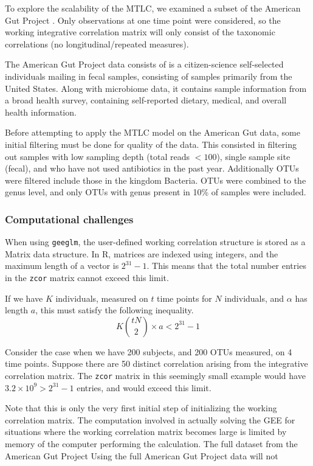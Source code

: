 \documentclass[12pt]{article}
\begin{document}
To explore the scalability of the MTLC, we examined a subset of the American Gut Project \cite{mayer2015gut}. Only observations at one time point were considered, so the working integrative correlation matrix will only consist of the taxonomic correlations (no longitudinal/repeated measures).

The American Gut Project data consists of is a citizen-science self-selected individuals mailing in fecal samples, consisting of samples primarily from the United States. Along with microbiome data, it contains sample information from a broad health survey, containing self-reported dietary, medical, and overall health information.

Before attempting to apply the MTLC model on the American Gut data, some initial filtering must be done for quality of the data. This consisted in filtering out samples with low sampling depth (total reads $< 100$), single sample site (fecal), and who have not used antibiotics in the past year. Additionally OTUs were filtered include those in the kingdom Bacteria. OTUs were combined to the genus level, and only OTUs with genus present in 10\% of samples were included.

\subsubsection{Computational challenges}

When using \texttt{geeglm}, the user-defined working correlation structure is stored as a Matrix data structure. In R, matrices are indexed using integers, and the maximum length of a vector is $2^{31}-1$. This means that the total number entries in the \texttt{zcor} matrix cannot exceed this limit.

If we have $K$ individuals, measured on $t$ time points for $N$ individuals, and $\alpha$ has length $a$, this must satisfy the following inequality.
$$ K \binom{tN}{2} \times a < 2^{31}-1$$

Consider the case when we have 200 subjects, and 200 OTUs measured, on 4 time points. Suppose there are 50 distinct correlation arising from the integrative correlation matrix. The \texttt{zcor} matrix in this seemingly small example would have $3.2 \times 10^9 > 2^{31}-1$ entries, and would exceed this limit.

Note that this is only the very first initial step of initializing the working correlation matrix. The computation involved in actually solving the GEE for situations where the working correlation matrix becomes large is limited by memory of the computer performing the calculation. The full dataset from the American Gut Project Using the full American Gut Project data will not
\end{document}
